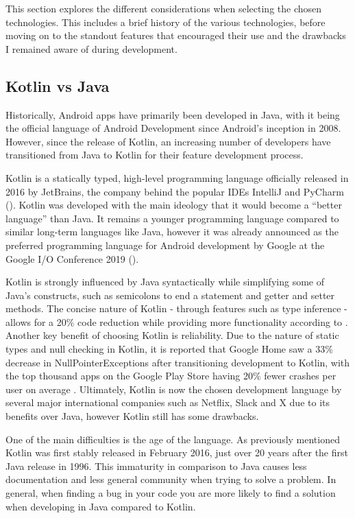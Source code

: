 \documentclass{l4proj}
\begin{document}
This section explores the different considerations when selecting the chosen technologies. This includes a brief history of the various technologies, before moving on to the standout features that encouraged their use and the drawbacks I remained aware of during development.

\subsection{Kotlin vs Java}
\label{sec:kotlinvsjava}

Historically, Android apps have primarily been developed in Java, with it being the official language of Android Development since Android’s inception in 2008. However, since the release of Kotlin, an increasing number of developers have transitioned from Java to Kotlin for their feature development process.

Kotlin is a statically typed, high-level programming language officially released in 2016 by JetBrains, the company behind the popular IDEs IntelliJ and PyCharm (\cite{Breslav_2016}). Kotlin was developed with the main ideology that it would become a “better language” than Java. It remains a younger programming language compared to similar long-term languages like Java, however it was already announced as the preferred programming language for Android development by Google at the Google I/O Conference 2019 (\cite{Haase_2019}).

Kotlin is strongly influenced by Java syntactically while simplifying some of Java’s constructs, such as semicolons to end a statement and getter and setter methods. The concise nature of Kotlin - through features such as type inference - allows for a 20\% code reduction while providing more functionality according to \cite{Korly_2019}. Another key benefit of choosing Kotlin is reliability. Due to the nature of static types and null checking in Kotlin, it is reported that Google Home saw a 33\% decrease in NullPointerExceptions after transitioning development to Kotlin, with the top thousand apps on the Google Play Store having 20\% fewer crashes per user on average \cite{Muntenescu_2020}. Ultimately, Kotlin is now the chosen development language by several major international companies such as Netflix, Slack and X due to its benefits over Java, however Kotlin still has some drawbacks.

One of the main difficulties is the age of the language. As previously mentioned Kotlin was first stably released in February 2016, just over 20 years after the first Java release in 1996. This immaturity in comparison to Java causes less documentation and less general community when trying to solve a problem. In general, when finding a bug in your code you are more likely to find a solution when developing in Java compared to Kotlin.
\end{document}
